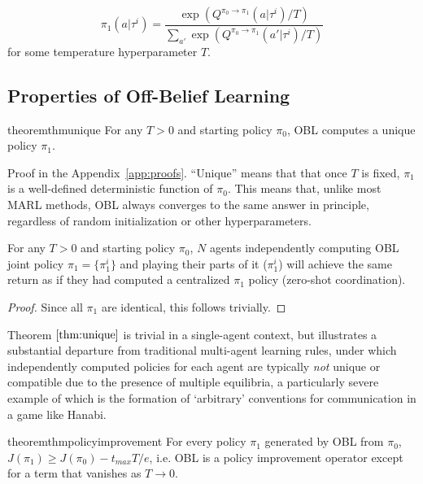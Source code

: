 \begin{equation}
    \label{eq:pi1}
    \pi_1(a|\tau^i)=\frac{\exp (Q^{\pi_0\to \pi_1}(a|\tau^i)/T) }{\sum_{a'} \exp (Q^{\pi_0\to \pi_1}(a'|\tau^i)/T)}
\end{equation}
for some temperature hyperparameter $T$.

\subsection{Properties of Off-Belief Learning}

\begin{restatable}{theorem}{thmunique}
\label{thm:unique}
For any $T>0$ and starting policy $\pi_0$, OBL computes a unique policy $\pi_1$.
\end{restatable}
Proof in the Appendix~\ref{app:proofs}. ``Unique'' means that that\sam{,} once $T$ is fixed, $\pi_1$ is a well-defined deterministic function of $\pi_0$. This means that, unlike most MARL methods, OBL always converges to the same answer in principle, regardless of random initialization or other hyperparameters.
\vspace{0.15cm}
\begin{corollary}
For any $T>0$ and starting policy $\pi_0$, $N$ agents independently computing OBL joint policy $\pi_1 = \{\pi_1^i\}$ and playing their parts of it ($\pi_1^i$) will achieve the same return as if they had computed a centralized $\pi_1$ policy (zero-shot coordination).
\label{cor:pi1}
\end{corollary}
\begin{proof}
Since all $\pi_1$ are identical, this follows trivially.
\end{proof}

Theorem $\ref{thm:unique}$ is trivial in a single-agent context, but illustrates a substantial departure from traditional multi-agent learning rules, under which independently computed policies for each agent are typically \textit{not} unique or compatible due to the presence of multiple equilibria, a particularly severe example of which is the formation of `arbitrary' conventions for communication in a game like Hanabi.

\begin{restatable}{theorem}{thmpolicyimprovement}
For every policy $\pi_1$ generated by OBL from $\pi_0$, $J(\pi_1) \geq J(\pi_0) - t_{max}T/e$, i.e. OBL is a policy improvement operator except for a term that vanishes as $T \to 0$.
\label{thm:policy_improvement}
\end{restatable}

